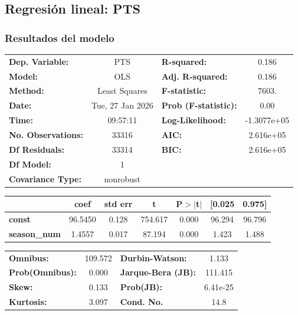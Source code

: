 \subsection{Regresión lineal: PTS}

\subsubsection{Resultados del modelo}
\begin{center}
\begin{tabular}{lclc}
\toprule
\textbf{Dep. Variable:}    &       PTS        & \textbf{  R-squared:         } &      0.186   \\
\textbf{Model:}            &       OLS        & \textbf{  Adj. R-squared:    } &      0.186   \\
\textbf{Method:}           &  Least Squares   & \textbf{  F-statistic:       } &      7603.   \\
\textbf{Date:}             & Tue, 27 Jan 2026 & \textbf{  Prob (F-statistic):} &      0.00    \\
\textbf{Time:}             &     09:57:11     & \textbf{  Log-Likelihood:    } & -1.3077e+05  \\
\textbf{No. Observations:} &       33316      & \textbf{  AIC:               } &  2.616e+05   \\
\textbf{Df Residuals:}     &       33314      & \textbf{  BIC:               } &  2.616e+05   \\
\textbf{Df Model:}         &           1      & \textbf{                     } &              \\
\textbf{Covariance Type:}  &    nonrobust     & \textbf{                     } &              \\
\bottomrule
\end{tabular}
\begin{tabular}{lcccccc}
                     & \textbf{coef} & \textbf{std err} & \textbf{t} & \textbf{P$> |$t$|$} & \textbf{[0.025} & \textbf{0.975]}  \\
\midrule
\textbf{const}       &      96.5450  &        0.128     &   754.617  &         0.000        &       96.294    &       96.796     \\
\textbf{season\_num} &       1.4557  &        0.017     &    87.194  &         0.000        &        1.423    &        1.488     \\
\bottomrule
\end{tabular}
\begin{tabular}{lclc}
\textbf{Omnibus:}       & 109.572 & \textbf{  Durbin-Watson:     } &    1.133  \\
\textbf{Prob(Omnibus):} &   0.000 & \textbf{  Jarque-Bera (JB):  } &  111.415  \\
\textbf{Skew:}          &   0.133 & \textbf{  Prob(JB):          } & 6.41e-25  \\
\textbf{Kurtosis:}      &   3.097 & \textbf{  Cond. No.          } &     14.8  \\
\bottomrule
\end{tabular}
\end{center}

